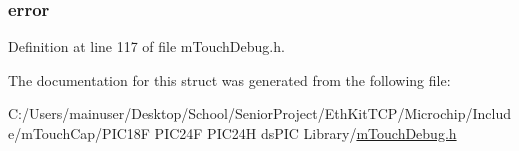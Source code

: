 \hypertarget{structtag___d_e_b_u_g_d_e_l_a_y_a2c336ec489f664295b2020b126f23ed4}{}
\subsubsection[{error}]{ error}\label{structtag___d_e_b_u_g_d_e_l_a_y_a2c336ec489f664295b2020b126f23ed4}


Definition at line 117 of file m\+Touch\+Debug.\+h.



The documentation for this struct was generated from the following file\+:\begin{DoxyCompactItemize}
\item 
C\+:/\+Users/mainuser/\+Desktop/\+School/\+Senior\+Project/\+Eth\+Kit\+T\+C\+P/\+Microchip/\+Include/m\+Touch\+Cap/\+P\+I\+C18\+F P\+I\+C24\+F P\+I\+C24\+H ds\+P\+I\+C Library/\hyperlink{m_touch_debug_8h}{m\+Touch\+Debug.\+h}\end{DoxyCompactItemize}

